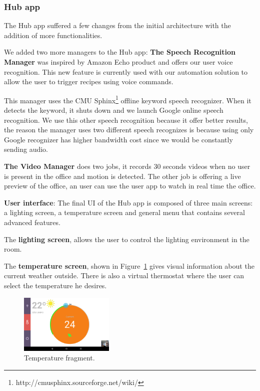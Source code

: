 \documentclass[conference]{IEEEtran}
\begin{document}
\subsubsection{Hub app}

The Hub app suffered a few changes from the initial architecture with the addition of more functionalities.

We added two more managers to the Hub app: 
\textbf{The Speech Recognition Manager} was inspired by Amazon Echo product and offers our user voice recognition. This new feature is currently used with our automation solution to allow the user to trigger recipes using voice commands. 

This manager uses the CMU Sphinx\footnote{http://cmusphinx.sourceforge.net/wiki/} offline keyword speech recognizer. When it detects the keyword, it shuts down and we launch Google online speech recognition. We use this other speech recognition because it offer better results, the reason the manager uses two different speech recognizes is because using only Google recognizer has higher bandwidth cost since we would be constantly sending audio. 

\textbf{The Video Manager} does two jobs, it records 30 seconds videos when no user is present in the office and motion is detected. The other job is offering a live preview of the office, an user can use the user app to watch in real time the office.



\textbf{User interface}: The final \ac{UI} of the Hub app is composed of three main screens: a lighting screen, a temperature screen and general menu that contains several advanced features.

The \textbf{lighting screen}, allows the user to control the lighting environment in the room.

The \textbf{temperature screen}, shown in Figure~\ref{screen_temperature} gives visual information about the current weather outside. There is also a virtual thermostat where the user can select the temperature he desires. 


\begin{figure}[h]
\centering
\includegraphics[width=0.4\textwidth]{Figures/screen_temperature}
\caption{Temperature fragment.}
\label{screen_temperature}
\end{figure}
\end{document}
